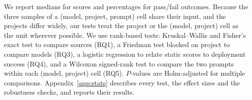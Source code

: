 We report medians for scores and percentages for pass/fail outcomes. Because the three samples of a (model, project, prompt) cell share their input, and the projects differ widely, our tests treat the project or the (model, project) cell as the unit wherever possible. We use rank-based tests: Kruskal--Wallis and Fisher's exact test to compare sources (RQ1), a Friedman test blocked on project to compare models (RQ3), a logistic regression to relate static scores to deployment success (RQ4), and a Wilcoxon signed-rank test to compare the two prompts within each (model, project) cell (RQ5). $P$-values are Holm-adjusted for multiple comparisons. Appendix~\ref{app:stats} describes every test, the effect sizes and the robustness checks, and reports their results.
